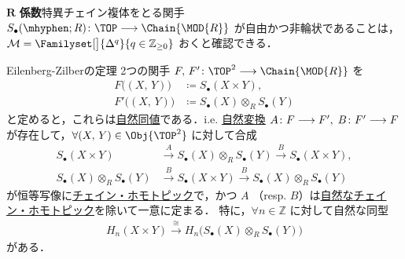 \documentclass[algtopo_main]{subfiles}
\begin{document}
$\bm{R}$ \textbf{係数}特異チェイン複体をとる関手 $S_\bullet (\mhyphen; R) \colon \TOP \lto \Chain{\MOD{R}}$ が自由かつ非輪状であることは，$\mathcal{M} = \Familyset[\big]{\Delta^q}{q \in \mathbb{Z}_{\ge 0}}$ おくと確認できる．


\begin{mytheo}[label=thm:EZ, breakable]{Eilenberg-Zilberの定理}
    2つの関手 $F,\, F' \colon \TOP^2 \lto \Chain{\MOD{R}}$ を
    \begin{align}
        F \bigl( (X,\, Y) \bigr) &\coloneqq S_\bullet (X \times Y), \\
        F' \bigl( (X,\, Y) \bigr) &\coloneqq S_\bullet (X) \otimes_R S_\bullet(Y)
    \end{align}
    と定めると，これらは\hyperref[def:naturallyeq]{自然同値}である．i.e. \hyperref[def:nat]{自然変換} $A \colon F \longrightarrow F',\; B \colon F' \longrightarrow F$ が存在して，$\forall (X,\, Y) \in \Obj{\TOP^2}$ に対して合成
    \begin{align}
        S_\bullet (X\times Y) &\xrightarrow{A} S_\bullet(X) \otimes_R S_\bullet (Y) \xrightarrow{B} S_\bullet (X\times Y), \\
        S_\bullet (X) \otimes_R S_\bullet(Y) &\xrightarrow{B} S_\bullet(X\times Y) \xrightarrow{B} S_\bullet (X) \otimes_R S_\bullet (Y)
    \end{align}
    が恒等写像に\hyperref[def:chain-homotopic]{チェイン・ホモトピック}で，かつ $A$ （resp. $B$）は\underline{自然な}\hyperref[def:chain-homotopic]{チェイン・ホモトピック}を除いて一意に定まる．
    特に，$\forall n \in \mathbb{Z}$ に対して自然な同型
    \begin{align}
        \label{isom:EZ}
        H_n (X \times Y) \xrightarrow{\cong} H_n \bigl( S_\bullet (X) \otimes_R S_\bullet (Y) \bigr) 
    \end{align}
    がある．
\end{mytheo}
\end{document}
